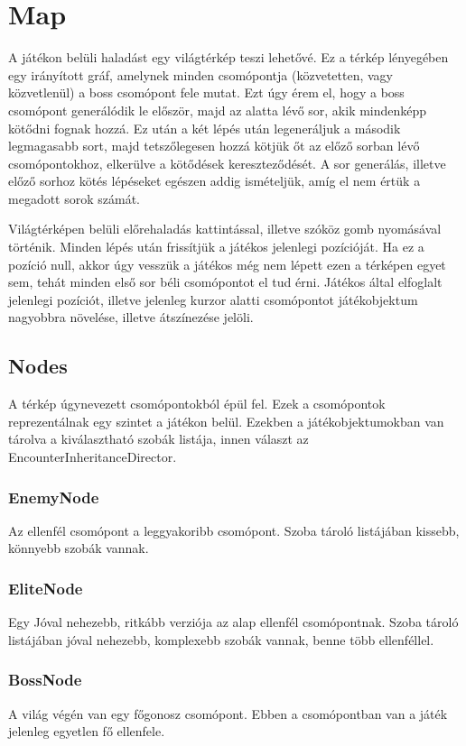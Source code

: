 \documentclass[
]{thesis-ekf}
\theoremstyle{definition}
\theoremstyle{remark}
\begin{document}
	\section{Map}
	A játékon belüli haladást egy világtérkép teszi lehetővé. Ez a térkép lényegében egy irányított gráf, amelynek minden csomópontja (közvetetten, vagy közvetlenül) a boss csomópont fele mutat. Ezt úgy érem el, hogy a boss csomópont generálódik le először, majd az alatta lévő sor, akik mindenképp kötődni fognak hozzá. Ez után a két lépés után legeneráljuk a második legmagasabb sort, majd tetszőlegesen hozzá kötjük őt az előző sorban lévő csomópontokhoz, elkerülve a kötődések kereszteződését. A sor generálás, illetve előző sorhoz kötés lépéseket egészen addig ismételjük, amíg el nem értük a megadott sorok számát.
	
	Világtérképen belüli előrehaladás kattintással, illetve szóköz gomb nyomásával történik. Minden lépés után frissítjük a játékos jelenlegi pozícióját. Ha ez a pozíció null, akkor úgy vesszük a játékos még nem lépett ezen a térképen egyet sem, tehát minden első sor béli csomópontot el tud érni. Játékos által elfoglalt jelenlegi pozíciót, illetve jelenleg kurzor alatti csomópontot játékobjektum nagyobbra növelése, illetve átszínezése jelöli.
	\subsection{Nodes}
	A térkép úgynevezett csomópontokból épül fel. Ezek a csomópontok reprezentálnak egy szintet a játékon belül. Ezekben a játékobjektumokban van tárolva a kiválasztható szobák listája, innen választ az EncounterInheritanceDirector.
	\subsubsection{EnemyNode}
	Az ellenfél csomópont a leggyakoribb csomópont. Szoba tároló listájában kissebb, könnyebb szobák vannak.
	\subsubsection{EliteNode}
	Egy Jóval nehezebb, ritkább verziója az alap ellenfél csomópontnak. Szoba tároló listájában jóval nehezebb, komplexebb szobák vannak, benne több ellenféllel.
	\subsubsection{BossNode}
	A világ végén van egy főgonosz csomópont. Ebben a csomópontban van a játék jelenleg egyetlen fő ellenfele.
\end{document}
